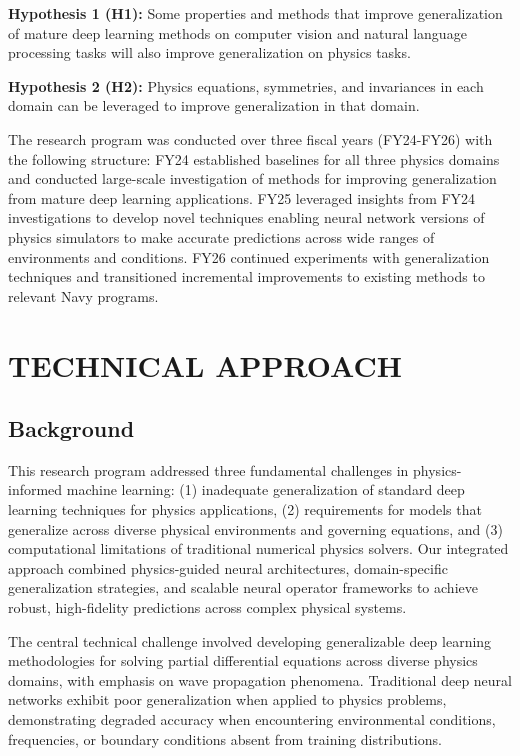 \documentclass{article}
\begin{document}
\textbf{Hypothesis 1 (H1):} Some properties and methods that improve generalization of mature deep learning methods on computer vision and natural language processing tasks will also improve generalization on physics tasks.

\textbf{Hypothesis 2 (H2):} Physics equations, symmetries, and invariances in each domain can be leveraged to improve generalization in that domain.

The research program was conducted over three fiscal years (FY24-FY26) with the following structure: FY24 established baselines for all three physics domains and conducted large-scale investigation of methods for improving generalization from mature deep learning applications. FY25 leveraged insights from FY24 investigations to develop novel techniques enabling neural network versions of physics simulators to make accurate predictions across wide ranges of environments and conditions. FY26 continued experiments with generalization techniques and transitioned incremental improvements to existing methods to relevant Navy programs.

\section{TECHNICAL APPROACH}

\subsection{Background}

This research program addressed three fundamental challenges in physics-informed machine learning: (1) inadequate generalization of standard deep learning techniques for physics applications, (2) requirements for models that generalize across diverse physical environments and governing equations, and (3) computational limitations of traditional numerical physics solvers. Our integrated approach combined physics-guided neural architectures, domain-specific generalization strategies, and scalable neural operator frameworks to achieve robust, high-fidelity predictions across complex physical systems.

The central technical challenge involved developing generalizable deep learning methodologies for solving partial differential equations across diverse physics domains, with emphasis on wave propagation phenomena. Traditional deep neural networks exhibit poor generalization when applied to physics problems, demonstrating degraded accuracy when encountering environmental conditions, frequencies, or boundary conditions absent from training distributions.
\end{document}
